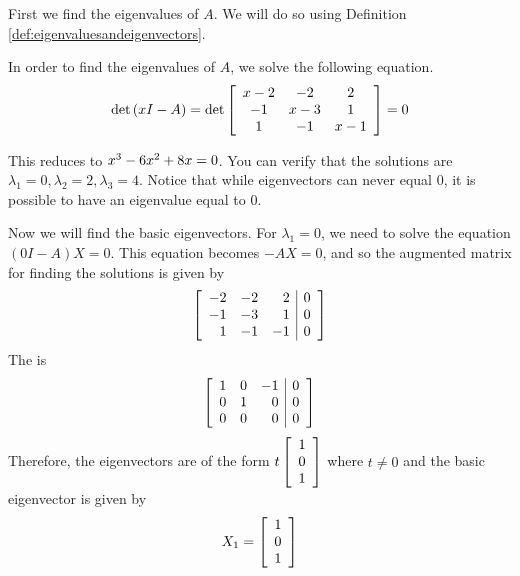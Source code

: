 \begin{solution}
First we find the eigenvalues of $A$. We will do so using Definition
\ref{def:eigenvaluesandeigenvectors}. 

In order to find the eigenvalues of $A$, we solve the following equation.
\begin{equation*}
\det \left(x I -A \right) =
\det  \left[ 
\begin{array}{ccc}
x -2 & -2 & 2 \\
 -1 & x - 3  & 1 \\
1 & -1 &  x  -1 
\end{array}
\right]
 =0
\end{equation*}

This reduces to $ x^{3}-6 x^{2}+8x =0$. You can verify that the
solutions are $ \lambda_1 = 0, \lambda_2 = 2, \lambda_3 = 4$.
Notice that while eigenvectors can never equal $0$, it is possible to have an eigenvalue equal to $0$. 

Now we will find the basic eigenvectors. For $\lambda_1 =0$, we need to solve the equation
$\left( 0 I - A \right) X = 0$. This equation becomes $-AX=0$, and so the augmented matrix for finding
the solutions is given by 
\begin{equation*}
\left[ 
\begin{array}{rrr|r}
-2 & -2 & 2 & 0 \\
-1 & -3 & 1 & 0 \\
1 & -1 & -1 & 0
\end{array}
\right]
\end{equation*}
The {\rref} is
\begin{equation*}
\left[
\begin{array}{rrr|r}
1 & 0 & -1 & 0 \\
0 & 1 &  0 & 0 \\
0 & 0 &  0 & 0
\end{array}
\right]
\end{equation*}
Therefore, the eigenvectors are of the form $ t\left[
\begin{array}{r}
1 \\
0 \\
1
\end{array}
\right]$ where $t\neq 0$ and the basic eigenvector is given by
\begin{equation*}
X_1
=
\left[
\begin{array}{r}
1 \\
0 \\
1
\end{array}
\right]
\end{equation*}


\end{solution}
